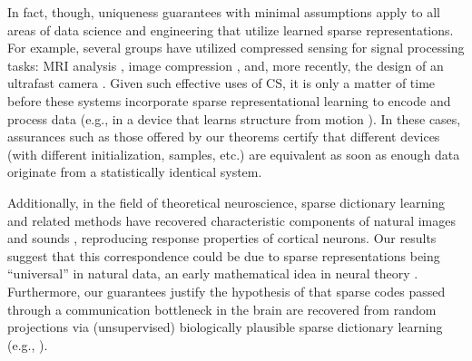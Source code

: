 \documentclass[9pt,twocolumn]{pnas-new}
\begin{document}
In fact, though, uniqueness guarantees with minimal assumptions apply to all areas of data science and engineering that utilize learned sparse representations.  For example, several groups have utilized compressed sensing for signal processing tasks: MRI analysis \cite{lustig2008compressed},  image compression \cite{Duarte08}, and, more recently, the design of an ultrafast camera \cite{Gao14}. Given such effective uses of CS, it is only a matter of time before these systems incorporate sparse representational learning to encode and process data (e.g., in a device that learns structure from motion \cite{kong2016prior}).  In these cases, assurances such as those offered by our theorems certify that different devices (with different initialization, samples, etc.) are equivalent as soon as enough data originate from a statistically identical system.
%  

Additionally, in the field of theoretical neuroscience, sparse dictionary learning and related methods have recovered characteristic components of natural images \cite{Olshausen96, hurri1996image, bell1997independent, van1998independent} and sounds \cite{bellsejnowski1996, smithlewicki2006, Carlson12}, reproducing response properties of cortical neurons. Our results suggest that this correspondence could be due to  sparse representations being ``universal'' in natural data, an early mathematical idea in neural theory \cite{pitts1947}. Furthermore, our guarantees justify the hypothesis of \cite{Coulter10, Isely10} that sparse codes passed through a communication bottleneck in the brain are recovered from random projections via (unsupervised) biologically plausible sparse dictionary learning (e.g., \cite{rehnsommer2007, rozell2007neurally, hu2014hebbian}).  




\end{document}
